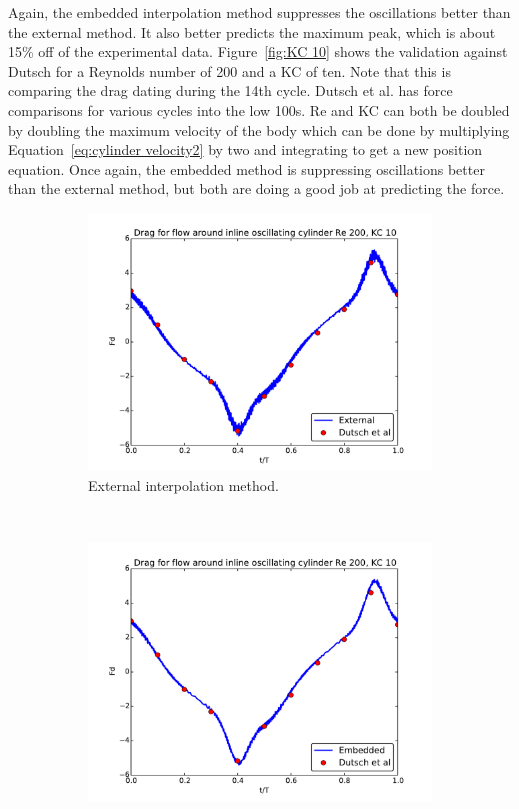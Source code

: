 Again, the embedded interpolation method suppresses the oscillations better than the external method. It also better predicts the maximum peak, which is about 15\% off of the experimental data.
Figure~\ref{fig:KC 10} shows the validation against Dutsch for a Reynolds number of 200 and a KC of ten. 
Note that this is comparing the drag dating during the 14th cycle. 
Dutsch et al. has force comparisons for various cycles into the low 100s.
Re and KC can both be doubled by doubling the maximum velocity of the body which can be done by multiplying Equation~\eqref{eq:cylinder velocity2} by two and integrating to get a new position equation.
Once again, the embedded method is suppressing oscillations better than the external method, but both are doing a good job at predicting the force. 
\begin{figure}[!htb]
	\centering
	\begin{subfigure}{0.4\textwidth}
		\includegraphics[width=\linewidth]{External_static_kc10}
		\caption{External interpolation method.}
	\end{subfigure}
	~
	\begin{subfigure}{0.4\textwidth}
		\includegraphics[width=\linewidth]{Embedded_static_kc10}

\end{subfigure}
\end{figure}
